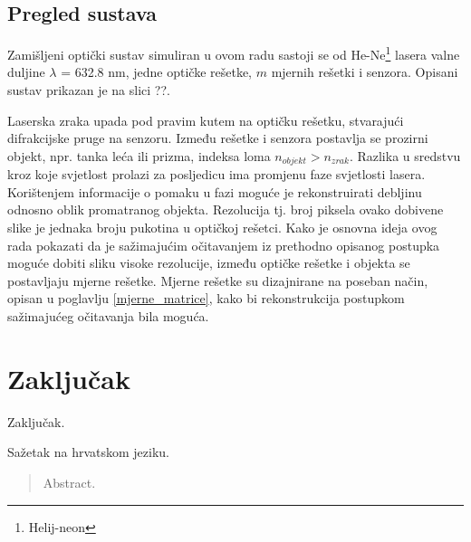 \documentclass[times, utf8, diplomski, numeric]{fer}
\begin{document}
\section{Pregled sustava}
Zamišljeni optički sustav simuliran u ovom radu sastoji se od He-Ne\footnote{Helij-neon} lasera valne duljine $\lambda$ = 632.8 nm, jedne optičke rešetke, $m$ mjernih rešetki i senzora. Opisani sustav prikazan je na slici ??. 

Laserska zraka upada pod pravim kutem na optičku rešetku, stvarajući difrakcijske pruge na senzoru. Između rešetke i senzora postavlja se prozirni objekt, npr. tanka leća ili prizma, indeksa loma $n_{objekt} > n_{zrak}$. Razlika u sredstvu kroz koje svjetlost prolazi za posljedicu ima promjenu faze svjetlosti lasera. Korištenjem informacije o pomaku u fazi moguće je rekonstruirati debljinu odnosno oblik promatranog objekta. Rezolucija tj. broj piksela ovako dobivene slike je jednaka broju pukotina u optičkoj rešetci. Kako je osnovna ideja ovog rada pokazati da je sažimajućim očitavanjem iz prethodno opisanog postupka moguće dobiti sliku visoke rezolucije, između optičke rešetke i objekta se postavljaju mjerne rešetke. Mjerne rešetke su dizajnirane na poseban način, opisan u poglavlju \ref{mjerne_matrice}, kako bi rekonstrukcija postupkom sažimajućeg očitavanja bila moguća.


\chapter{Zaključak}
Zaključak.




\begin{sazetak}
Sažetak na hrvatskom jeziku.

\end{sazetak}

\begin{abstract}
Abstract.

\end{abstract}
\end{document}
